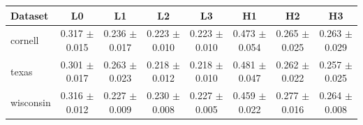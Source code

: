 \begin{tabular*}{0.94\linewidth}{@{\extracolsep{\fill}}lccccccc@{}}
\toprule
Dataset & L0 & L1 & L2 & L3 & H1 & H2 & H3 \\
\midrule
cornell & 0.317 $\pm$ 0.015 & 0.236 $\pm$ 0.017 & 0.223 $\pm$ 0.010 & 0.223 $\pm$ 0.010 & 0.473 $\pm$ 0.054 & 0.265 $\pm$ 0.025 & 0.263 $\pm$ 0.029 \\
texas & 0.301 $\pm$ 0.017 & 0.263 $\pm$ 0.023 & 0.218 $\pm$ 0.012 & 0.218 $\pm$ 0.010 & 0.481 $\pm$ 0.047 & 0.262 $\pm$ 0.022 & 0.257 $\pm$ 0.025 \\
wisconsin & 0.316 $\pm$ 0.012 & 0.227 $\pm$ 0.009 & 0.230 $\pm$ 0.008 & 0.227 $\pm$ 0.005 & 0.459 $\pm$ 0.022 & 0.277 $\pm$ 0.016 & 0.264 $\pm$ 0.008 \\
\bottomrule
\end{tabular*}
